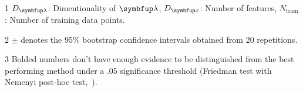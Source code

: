 \begin{table*}
\begin{threeparttable}
\begin{tabular}{lrrrccccc}
    \\\bottomrule
  \end{tabular}
  \begin{tablenotes}
    \item[1] {\footnotesize \(D_{\vlambda}\): Dimentionality of \(\vlambda\), \(D_{\vx}\): Number of features, \(N_{\text{train}}\): Number of training data points.}
    \item[2] {\footnotesize \(\pm\) denotes the 95\% bootstrap confidence intervals obtained from 20 repetitions.}
    \item[3] {\footnotesize Bolded numbers don't have enough evidence to be distinguished from the best performing method under a .05 significance threshold (Friedman test with Nemenyi post-hoc test,~\citealt{JMLR:v7:demsar06a})}.
  \end{tablenotes}
  \end{threeparttable}
  \vspace{-0.1in}
\end{table*}

